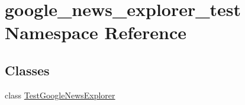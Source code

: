 \hypertarget{namespacegoogle__news__explorer__test}{\section{google\-\_\-news\-\_\-explorer\-\_\-test Namespace Reference}
\label{namespacegoogle__news__explorer__test}
}
\subsection*{Classes}
\begin{DoxyCompactItemize}
\item 
class \hyperlink{classgoogle__news__explorer__test_1_1TestGoogleNewsExplorer}{Test\-Google\-News\-Explorer}
\end{DoxyCompactItemize}
